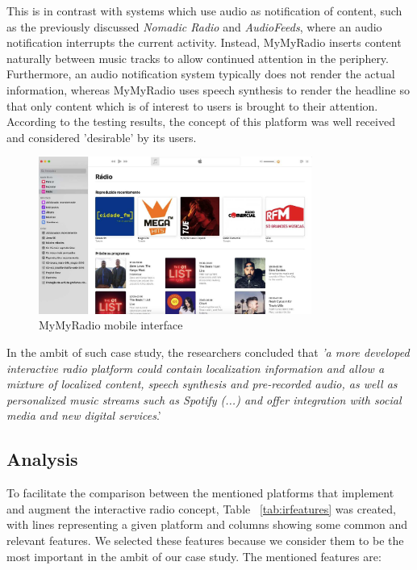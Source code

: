 This is in contrast with systems which use audio as notification of content, such as the previously discussed \textit{Nomadic Radio} and \textit{AudioFeeds}, where an audio notification interrupts the current activity. Instead, MyMyRadio inserts content naturally between music tracks to allow continued attention in the periphery. Furthermore, an audio notification system typically does not render the actual information, whereas MyMyRadio uses speech synthesis to render the headline so that only content which is of interest to users is brought to their attention. According to the testing results, the concept of this platform was well received and considered 'desirable' by its users.

\begin{figure}[h]
\centering
\includegraphics[width=0.8\textwidth]{./Images/applemusic.png}
\caption{MyMyRadio mobile interface}
\label{fig:test_env}
\end{figure}

In the ambit of such case study, the researchers concluded that \textit{'a more developed interactive radio platform could contain localization information and allow a mixture of localized content, speech synthesis and pre-recorded audio, as well as personalized music streams such as Spotify (...) and offer integration with social media and new digital services}.'


\subsection{Analysis}

To facilitate the comparison between the mentioned platforms that implement and augment the interactive radio concept, Table ~\ref{tab:irfeatures} was created, with lines representing a given platform and columns showing some common and relevant features. We selected these features because we consider them to be the most important in the ambit of our case study. The mentioned features are:

